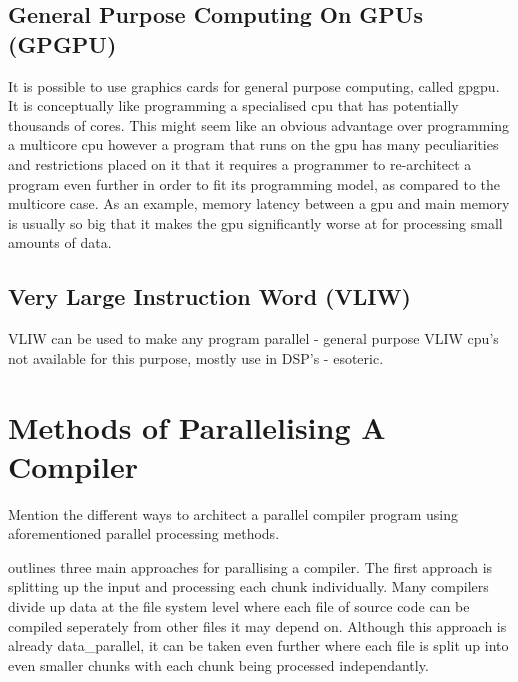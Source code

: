 \subsection{General Purpose Computing On GPUs (GPGPU)}
It is possible to use graphics cards for general purpose computing, called
\ac{gpgpu}. It is conceptually like programming a specialised \ac{cpu} that has
potentially thousands of cores. This might seem like an obvious advantage over
programming a multicore \ac{cpu} however a program that runs on the \ac{gpu} has
many peculiarities and restrictions placed on it that it requires a programmer
to re-architect a program even further in order to fit its programming model, as
compared to the multicore case. As an example, memory latency between a \ac{gpu}
and main memory is usually so big that it makes the \ac{gpu} significantly worse
at for processing small amounts of data.

\subsection{Very Large Instruction Word (VLIW)}
\begin{sectionplan}
     VLIW can be used to make any program parallel - general purpose VLIW cpu's
not available for this purpose, mostly use in DSP's - esoteric.
\end{sectionplan}
\cite{fisher_parallel_2004}

\section{Methods of Parallelising A Compiler} \label{compiler_parallel_methods}
\begin{sectionplan}
    Mention the different ways to architect a parallel compiler program using
aforementioned parallel processing methods.
\cite{hillis_data_1986, gross_parallel_1989, jena_design_2018, baer_model_1977}
\end{sectionplan}

\cite{gross_parallel_1989} outlines three main approaches for parallising a
compiler. The first approach is splitting up the input and processing each chunk
individually. Many compilers divide up data at the file system level where each
file of source code can be compiled seperately from other files it may depend
on. Although this approach is already \gls{data_parallel}, it can be taken even
further where each file is split up into even smaller chunks with each chunk
being processed independantly.


